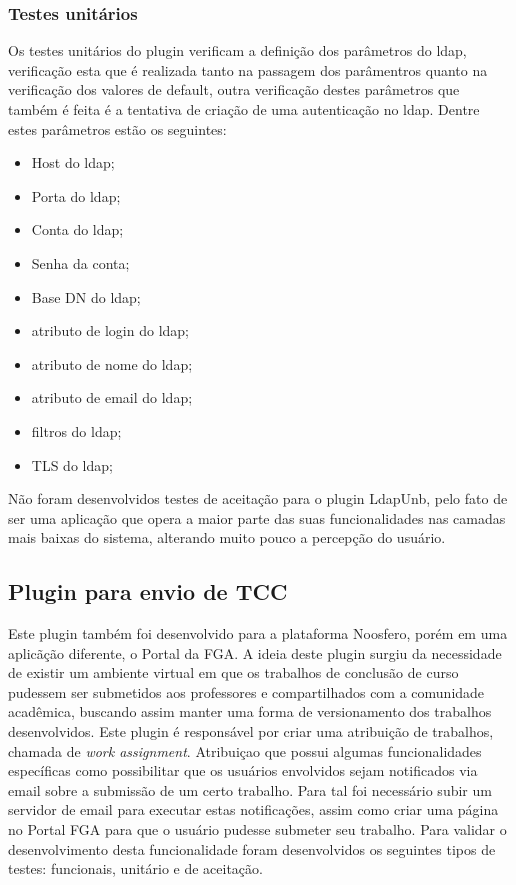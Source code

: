 
\subsubsection{Testes unitários}
%
Os testes unitários do plugin verificam a definição dos parâmetros do ldap, verificação esta que é realizada tanto na passagem dos parâmentros quanto na verificação dos valores de default, outra verificação destes parâmetros que também é feita é a tentativa de criação de uma autenticação no ldap. Dentre estes parâmetros estão os seguintes:

\begin{itemize}
\item Host do ldap;
\item Porta do ldap;
\item Conta do ldap;
\item Senha da conta;
\item Base DN do ldap;
\item atributo de login do ldap;
\item atributo de nome do ldap;
\item atributo de email do ldap;
\item filtros do ldap;
\item TLS do ldap;
\end{itemize}

Não foram desenvolvidos testes de aceitação para o plugin LdapUnb, pelo fato de ser uma aplicação que opera a maior parte das suas funcionalidades nas camadas mais baixas do sistema, alterando muito pouco a percepção do usuário.

\subsection{Plugin para envio de TCC}

Este plugin também foi desenvolvido para a plataforma Noosfero, porém em uma aplicãção diferente, o Portal da FGA. A ideia deste plugin surgiu da necessidade de existir um ambiente virtual em que os trabalhos de conclusão de curso pudessem ser submetidos aos professores e compartilhados com a comunidade acadêmica, buscando assim manter uma forma de versionamento dos trabalhos desenvolvidos.
%
Este plugin é responsável por criar uma atribuição de trabalhos, chamada de \textit{work assignment}. Atribuiçao que possui algumas funcionalidades específicas como possibilitar que os usuários envolvidos sejam notificados via email sobre a submissão de um certo trabalho. Para tal foi necessário subir um servidor de email para executar estas notificações, assim como criar uma página no Portal FGA para que o usuário pudesse submeter seu trabalho.
%
Para validar o desenvolvimento desta funcionalidade foram desenvolvidos os seguintes tipos de testes: funcionais, unitário e de aceitação.
